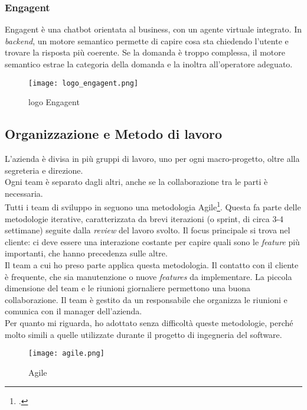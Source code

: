 \subsubsection{Engagent}

Engagent è una chatbot orientata al business, con un agente virtuale integrato. In \textit{backend}, un motore semantico permette di capire cosa sta chiedendo l'utente e trovare la risposta più coerente. Se la domanda è troppo complessa, il motore semantico estrae la categoria della domanda e la inoltra all'operatore adeguato.
\begin{figure}[H]
    \centering
    \texttt{[image: logo\_engagent.png]} 
    \caption{logo Engagent}
    \label{logo:engagent}
\end{figure}
\subsection{Organizzazione e Metodo di lavoro}
L'azienda è divisa in più gruppi di lavoro, uno per ogni macro-progetto, oltre alla segreteria e direzione.\\
Ogni team è separato dagli altri, anche se la collaborazione tra le parti è necessaria.\\
Tutti i team di sviluppo in \company{} seguono una metodologia Agile\footcite{site:agile-manifesto}. Questa fa parte delle metodologie iterative, caratterizzata da brevi iterazioni (o sprint, di circa 3-4 settimane) seguite dalla \textit{review} del lavoro svolto. Il focus principale si trova nel cliente: ci deve essere una interazione costante per capire quali sono le \textit{feature} più importanti, che hanno precedenza sulle altre.\\
Il team a cui ho preso parte applica questa metodologia. Il contatto con il cliente è frequente, che sia manutenzione o nuove \textit{features} da implementare. La piccola dimensione del team e le riunioni giornaliere permettono una buona collaborazione. Il team è gestito da un responsabile che organizza le riunioni e comunica con il manager dell'azienda.\\
Per quanto mi riguarda, ho adottato senza difficoltà queste metodologie, perché molto simili a quelle utilizzate durante il progetto di ingegneria del software.
\begin{figure}[H]
    \centering
    \texttt{[image: agile.png]} 
    \caption{Agile}
    \label{logo:agile}
\end{figure}


